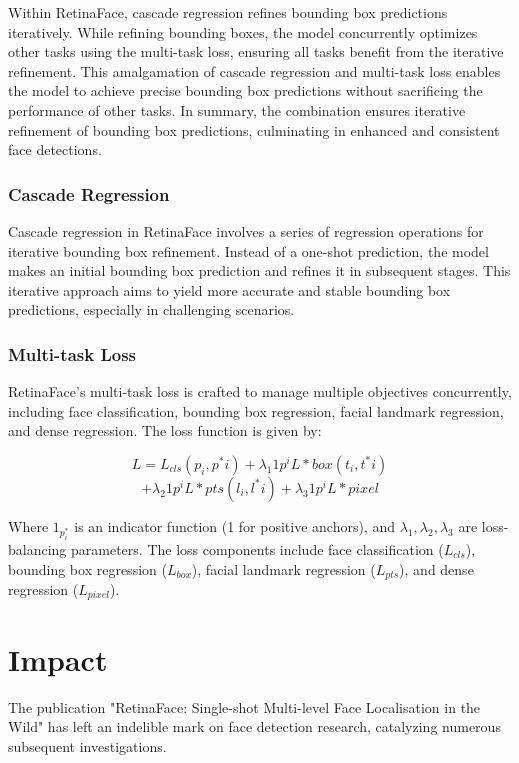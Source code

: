 \documentclass{article}
\begin{document}
Within RetinaFace, cascade regression refines bounding box predictions iteratively. While refining bounding boxes, the model concurrently optimizes other tasks using the multi-task loss, ensuring all tasks benefit from the iterative refinement. This amalgamation of cascade regression and multi-task loss enables the model to achieve precise bounding box predictions without sacrificing the performance of other tasks. In summary, the combination ensures iterative refinement of bounding box predictions, culminating in enhanced and consistent face detections.

\subsubsection{Cascade Regression}

Cascade regression in RetinaFace involves a series of regression operations for iterative bounding box refinement. Instead of a one-shot prediction, the model makes an initial bounding box prediction and refines it in subsequent stages. This iterative approach aims to yield more accurate and stable bounding box predictions, especially in challenging scenarios.

\subsubsection{Multi-task Loss}

RetinaFace's multi-task loss is crafted to manage multiple objectives concurrently, including face classification, bounding box regression, facial landmark regression, and dense regression. The loss function is given by:

\[ L = L_{cls}(p_i, p^*i) + \lambda_1 1{p^i} L*{box}(t_i, t^*i) \]
\[+ \lambda_2 1{p^i} L*{pts}(l_i, l^*i) + \lambda_3 1{p^i} L*{pixel} \]

Where \( 1_{p^*_i} \) is an indicator function (1 for positive anchors), and \( \lambda_1, \lambda_2, \lambda_3 \) are loss-balancing parameters. The loss components include face classification (\(L_{cls}\)), bounding box regression (\(L_{box}\)), facial landmark regression (\(L_{pts}\)), and dense regression (\(L_{pixel}\)).


\section{Impact}

The publication "RetinaFace: Single-shot Multi-level Face Localisation in the Wild" has left an indelible mark on face detection research, catalyzing numerous subsequent investigations.
\end{document}
